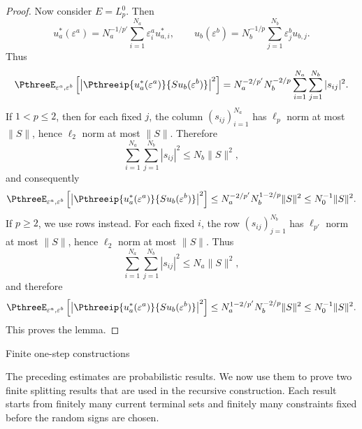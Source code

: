\documentclass[11pt,reqno]{amsart}
\makeatletter
\theoremstyle{plain}
\theoremstyle{definition}
\newcounter{problempaper}
\newenvironment{problempaperbody}{%
  \setcounter{subsection}{0}%
  \setcounter{subsubsection}{0}%
  \setcounter{paragraph}{0}%
  \renewcommand{\thesubsection}{\arabic{subsection}}%
  \renewcommand{\thesubsubsection}{\thesubsection.\arabic{subsubsection}}%
  \renewcommand{\theparagraph}{\thesubsubsection.\arabic{paragraph}}%
  \let\problem@outersection\section
  \let\problem@outersubsection\subsection
  \let\problem@outersubsubsection\subsubsection
  \let\problem@outerparagraph\paragraph
  \let\section\problem@papersection
  \let\subsection\problem@papersubsection
  \let\subsubsection\problem@papersubsubsection
}{%
  \let\section\problem@outersection
  \let\subsection\problem@outersubsection
  \let\subsubsection\problem@outersubsubsection
  \let\paragraph\problem@outerparagraph
}
\newcommand{\problem@target}[2]{%
  \hypertarget{problem-\theproblempaper-#1-#2}{}%
}
\newcommand{\problem@paperheading}[3]{%
  \par\bigskip
  \problem@target{#1}{#2}%
  \noindent{\large\bfseries #2.\quad #3\par}%
  \nobreak\smallskip
}
\newcommand{\problem@papersubheading}[3]{%
  \par\medskip
  \problem@target{#1}{#2}%
  \noindent{\normalsize\bfseries #2.\quad #3\par}%
  \nobreak\smallskip
}
\newcommand{\problem@papersubsubheading}[3]{%
  \par\smallskip
  \problem@target{#1}{#2}%
  \noindent{\normalsize\itshape #2.\quad #3.\ }%
}
\def\problem@papersection{%
  \@ifstar{\problem@papersectionstar}{\problem@papersectionnostar}%
}
\def\problem@papersectionstar#1{%
  \par\bigskip\noindent{\large\bfseries #1\par}\nobreak\smallskip
}
\def\problem@papersectionnostar#1{%
  \refstepcounter{subsection}%
  \setcounter{subsubsection}{0}%
  \setcounter{paragraph}{0}%
  \problem@paperheading{section}{\thesubsection}{#1}%
  \problem@writecontentsline{section}{\thesubsection}{#1}%
}
\def\problem@papersubsection{%
  \@ifstar{\problem@papersubsectionstar}{\problem@papersubsectionnostar}%
}
\def\problem@papersubsectionstar#1{%
  \par\medskip\noindent{\normalsize\bfseries #1\par}\nobreak\smallskip
}
\def\problem@papersubsectionnostar#1{%
  \refstepcounter{subsubsection}%
  \setcounter{paragraph}{0}%
  \problem@papersubheading{subsection}{\thesubsubsection}{#1}%
  \problem@writecontentsline{subsection}{\thesubsubsection}{#1}%
}
\def\problem@papersubsubsection{%
  \@ifstar{\problem@papersubsubsectionstar}{\problem@papersubsubsectionnostar}%
}
\def\problem@papersubsubsectionstar#1{%
  \par\smallskip\noindent{\normalsize\itshape #1.\ }%
}
\def\problem@papersubsubsectionnostar#1{%
  \refstepcounter{paragraph}%
  \problem@papersubsubheading{subsubsection}{\theparagraph}{#1}%
  \problem@writecontentsline{subsubsection}{\theparagraph}{#1}%
}
\newcommand{\problem@writecontentsline}[3]{%
  \begingroup
  \protected@write\@auxout{}{%
    \string\problemcontentsentry{\theproblempaper}{#1}{#2}{#3}{\thepage}%
  }%
  \endgroup
}
\newcommand{\problemcontentsentry}[5]{%
  \@ifundefined{problemcontents@#1}{%
    \expandafter\gdef\csname problemcontents@#1\endcsname{}%
  }{}%
  \expandafter\g@addto@macro\csname problemcontents@#1\endcsname{%
    \problemcontentsline{#1}{#2}{#3}{#4}{#5}%
  }%
}
\newcommand{\problemcontentslink}[4]{%
  \hyperlink{problem-#1-#2-#3}{#4}%
}
\newcommand{\problemcontentsline}[5]{%
  \ifstrequal{#2}{section}{%
    \par\noindent
    \problemcontentslink{#1}{#2}{#3}{\makebox[2.5em][l]{#3}#4}%
    \nobreak\dotfill
    \problemcontentslink{#1}{#2}{#3}{#5}\par
  }{%
    \ifstrequal{#2}{subsection}{%
      \par\noindent\hspace*{1.5em}%
      \problemcontentslink{#1}{#2}{#3}{\makebox[3.5em][l]{#3}#4}%
      \nobreak\dotfill
      \problemcontentslink{#1}{#2}{#3}{#5}\par
    }{%
      \par\noindent\hspace*{3em}%
      \problemcontentslink{#1}{#2}{#3}{\makebox[4.5em][l]{#3}#4}%
      \nobreak\dotfill
      \problemcontentslink{#1}{#2}{#3}{#5}\par
    }%
  }%
}
\makeatother
\begin{document}
\begin{problempaperbody}
\begin{proof}
Now consider $E=L_p^0$. Then
\begin{equation*}
        u_a^*(\varepsilon^a)=N_a^{-1/p'}\sum_{i=1}^{N_a}\varepsilon_i^a u_{a,i}^*,\qquad u_b(\varepsilon^b)=N_b^{-1/p}\sum_{j=1}^{N_b}\varepsilon_j^b u_{b,j}.
\end{equation*}
Thus
\begin{equation*}
        \PthreeE_{\varepsilon^a,\varepsilon^b}\left[\left|\Pthreeip{u_a^*(\varepsilon^a)}{S u_b(\varepsilon^b)}\right|^2\right]=N_a^{-2/p'}N_b^{-2/p}\sum_{i=1}^{N_a}\sum_{j=1}^{N_b}|s_{ij}|^2.
\end{equation*}
If $1<p\leq2$, then for each fixed $j$, the column $(s_{ij})_{i=1}^{N_a}$ has $\ell_p$ norm at most $\|S\|$, hence $\ell_2$ norm at most $\|S\|$. Therefore
\begin{equation*}
        \sum_{i=1}^{N_a}\sum_{j=1}^{N_b}|s_{ij}|^2\leq N_b\|S\|^2,
\end{equation*}
and consequently
\begin{equation*}
        \PthreeE_{\varepsilon^a,\varepsilon^b}\left[\left|\Pthreeip{u_a^*(\varepsilon^a)}{S u_b(\varepsilon^b)}\right|^2\right]\leq N_a^{-2/p'}N_b^{1-2/p}\|S\|^2\leq N_0^{-1}\|S\|^2.
\end{equation*}
If $p\geq2$, we use rows instead. For each fixed $i$, the row $(s_{ij})_{j=1}^{N_b}$ has $\ell_{p'}$ norm at most $\|S\|$, hence $\ell_2$ norm at most $\|S\|$. Thus
\begin{equation*}
        \sum_{i=1}^{N_a}\sum_{j=1}^{N_b}|s_{ij}|^2\leq N_a\|S\|^2,
\end{equation*}
and therefore
\begin{equation*}
        \PthreeE_{\varepsilon^a,\varepsilon^b}\left[\left|\Pthreeip{u_a^*(\varepsilon^a)}{S u_b(\varepsilon^b)}\right|^2\right]\leq N_a^{1-2/p'}N_b^{-2/p}\|S\|^2\leq N_0^{-1}\|S\|^2.
\end{equation*}
This proves the lemma.
\end{proof}

\section{Finite one-step constructions}
\label{p3:sec:finite-one-step-constructions}

The preceding estimates are probabilistic results. We now use them to prove two finite splitting results that are used in the recursive construction. Each result starts from finitely many current terminal sets and finitely many constraints fixed before the random signs are chosen.


\end{problempaperbody}
\end{document}
